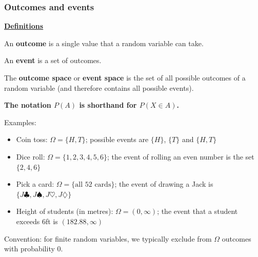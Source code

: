 \documentclass[t,8pt]{beamer}
\begin{document}
\begin{frame}
	\frametitle{Outcomes and events}
	{\bf\underline{Definitions}} \par
	An {\bf outcome} is a single value that a random variable can take. \par
	An {\bf event} is a set of outcomes. \par
	The {\bf outcome space} or {\bf event space} is the set of all possible outcomes of a random variable (and therefore contains all possible events). \par
	{\bf The notation $P(A)$ is shorthand for $P(X\in A)$.} \par
	Examples:
	\begin{itemize}
		\item Coin toss: $\Omega=\{H,T\}$; possible events are $\{H\}$, $\{T\}$ and $\{H,T\}$
		\item Dice roll: $\Omega=\{1,2,3,4,5,6\}$; the event of rolling an even number is the set $\{2,4,6\}$
		\item Pick a card: $\Omega=\{\text{all $52$ cards}\}$; the event of drawing a Jack is $\{J\clubsuit,J\spadesuit,J\heartsuit,J\diamondsuit\}$
		\item Height of students (in metres): $\Omega=(0,\infty)$; the event that a student exceeds $6$ft is $(182.88,\infty)$
	\end{itemize}
	Convention: for finite random variables, we typically exclude from $\Omega$ outcomes with probability $0$.
\end{frame}

\end{document}
